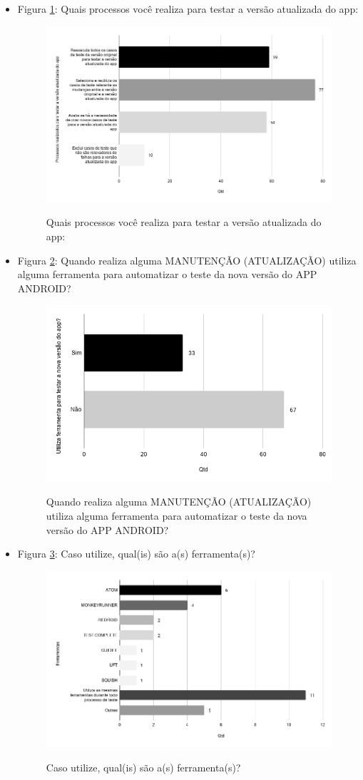 \begin{itemize}
    
    \item Figura \ref{figure:s_processostestemanutencao}: Quais processos você realiza para testar a versão atualizada do app:
    \begin{figure}[!htb]
    \centering
    \includegraphics[width=.55\textwidth]{images/s_processostestemanutencao.png}
    \label{figure:s_processostestemanutencao}
    \caption{Quais processos você realiza para testar a versão atualizada do app:}
    \end{figure} 
    
    
    \item Figura \ref{figure:s_testenovo}: Quando realiza alguma MANUTENÇÃO (ATUALIZAÇÃO) utiliza alguma ferramenta para automatizar o teste da nova versão do APP ANDROID?
    \begin{figure}[!htb]
    \centering
    \includegraphics[width=.55\textwidth]{images/s_testenovo.png}
    \label{figure:s_testenovo}
    \caption{Quando realiza alguma MANUTENÇÃO (ATUALIZAÇÃO) utiliza alguma ferramenta para automatizar o teste da nova versão do APP ANDROID?}
    \end{figure}
    
    
    \item Figura \ref{figure:s_ferramentastestenovo}: Caso utilize, qual(is) são a(s) ferramenta(s)?
    \begin{figure}[!htb]
    \centering
    \includegraphics[width=.55\textwidth]{images/s_ferramentastestenovo.png}
    \label{figure:s_ferramentastestenovo}
    \caption{Caso utilize, qual(is) são a(s) ferramenta(s)?}
    \end{figure}
    

\end{itemize}
